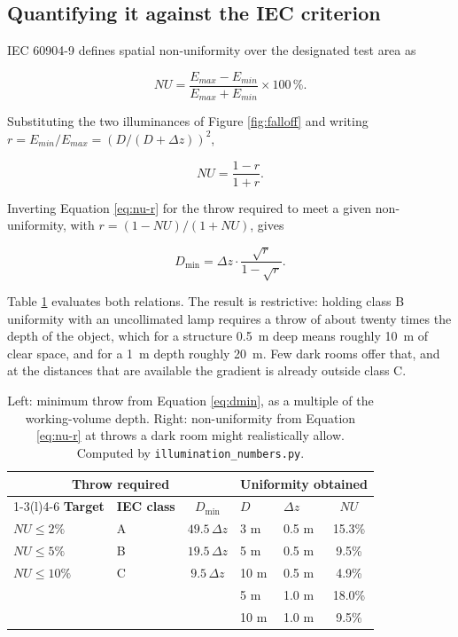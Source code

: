 \subsection{Quantifying it against the IEC criterion}

IEC 60904-9 defines spatial non-uniformity over the designated test area as \cite{iec60904_9_2020}

\begin{equation}
NU = \frac{E_{max} - E_{min}}{E_{max} + E_{min}} \times 100\,\% .
\label{eq:nu}
\end{equation}

Substituting the two illuminances of Figure \ref{fig:falloff} and writing $r = E_{min}/E_{max} = \left(D/(D+\Delta z)\right)^{2}$,

\begin{equation}
NU = \frac{1-r}{1+r} .
\label{eq:nu-r}
\end{equation}

Inverting Equation \ref{eq:nu-r} for the throw required to meet a given non-uniformity, with $r = (1-NU)/(1+NU)$, gives

\begin{equation}
D_{\min} = \Delta z \cdot \frac{\sqrt{r}}{1-\sqrt{r}} .
\label{eq:dmin}
\end{equation}

Table \ref{tab:falloff} evaluates both relations. The result is restrictive: holding class B uniformity with an uncollimated lamp requires a throw of about twenty times the depth of the object, which for a structure 0.5~m deep means roughly 10~m of clear space, and for a 1~m depth roughly 20~m. Few dark rooms offer that, and at the distances that are available the gradient is already outside class C.

\begin{table}[!ht]
\centering
\small
\caption[Throw required for a given uniformity, and uniformity obtained at a given throw]{Left: minimum throw from Equation \ref{eq:dmin}, as a multiple of the working-volume depth. Right: non-uniformity from Equation \ref{eq:nu-r} at throws a dark room might realistically allow. Computed by \texttt{illumination\_numbers.py}.}
\label{tab:falloff}
\setlength{\tabcolsep}{4pt}
\begin{tabular}{llc@{\hskip 0.7cm}llc}
\toprule
\multicolumn{3}{c}{\textbf{Throw required}} & \multicolumn{3}{c}{\textbf{Uniformity obtained}} \\
\cmidrule(r){1-3}\cmidrule(l){4-6}
\textbf{Target} & \textbf{IEC class} & \textbf{$D_{\min}$} & \textbf{$D$} & \textbf{$\Delta z$} & \textbf{$NU$} \\
\midrule
$NU \leq 2\%$  & A & $49.5\,\Delta z$ & 3 m  & 0.5 m & 15.3\% \\
$NU \leq 5\%$  & B & $19.5\,\Delta z$ & 5 m  & 0.5 m & 9.5\% \\
$NU \leq 10\%$ & C & $9.5\,\Delta z$  & 10 m & 0.5 m & 4.9\% \\
               &   &                  & 5 m  & 1.0 m & 18.0\% \\
               &   &                  & 10 m & 1.0 m & 9.5\% \\
\bottomrule
\end{tabular}
\end{table}

